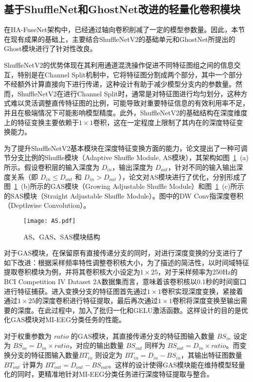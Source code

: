 \subsection{基于ShuffleNet和GhostNet改进的轻量化卷积模块}

在HA-FuseNet架构中，已经通过轴向卷积削减了一定的模型参数量。因此，本节在现有成果的基础上，主要结合ShuffleNetV2的基础单元和GhostNet所提出的Ghost模块进行了针对性改良。

ShuffleNetV2的优势体现在其利用通道混洗操作促进不同特征图组之间的信息交互，特别是在Channel Split机制中，它将特征图分割成两个部分，其中一个部分不经额外计算直接向下进行传递，这种设计有助于减少模型分支内的参数量。然而，ShuffleNetV2在进行Channel Split时，通常是对特征图进行均匀划分，这种方式难以灵活调整直传特征图的比例，可能导致对重要特征信息的有效利用率不足，并且在极端情况下可能影响模型精度。此外，ShuffleNetV2的基础结构在深度维度上的特征变换主要依赖于\(1\times1\)卷积，这在一定程度上限制了其内在的深度特征变换能力。

为了提升ShuffleNetV2基本模块在深度特征变换方面的能力，论文提出了一种可调节分支比例的Shuffle模块（Adaptive Shuffle Module, AS模块），其架构如图~\ref{fig:as}~(a)所示。假设卷积层的输入深度为 \(D_{in}\)，输出深度为 \(D_{out}\)，针对不同的输入输出深度关系（即 \(D_{in} \le D_{out}\) 和 \(D_{in} > D_{out}\) ），论文对AS模块进行了优化，分别形成了图~\ref{fig:as}~(b)所示的GAS模块（Growing Adjustable Shuffle Module）和图~\ref{fig:as}~(c)所示的SAS模块（Straight Adjustable Shuffle Module）。图中的DW Conv指深度卷积（Depthwise Convolution）。
\begin{figure}
    \centering
    \texttt{[image: AS.pdf]}
    \caption{AS、GAS、SAS模块结构}
    \label{fig:as}
\end{figure}

对于GAS模块，在保留原有直接传递分支的同时，对进行深度变换的分支进行了如下改进：根据采样频率特性调整卷积核大小，为了描述的简洁性，以时间域特征提取卷积模块为例，并将其卷积核大小设定为\(1 \times 25\)，对于采样频率为250Hz的BCI Competition IV Dataset 2A数据集而言，意味着该卷积核以0.1秒的时间窗口进行特征捕获。进入变换分支的特征图首先通过\(1 \times 1\)卷积实现深度变换，紧接着通过\(1 \times 25\)的深度卷积进行特征提取，最后再次通过\(1 \times 1\)卷积将深度变换至输出需要的深度。在此过程中，加入了批归一化和GELU激活函数。这样设计的目的是优化GAS模块对MI-EEG分类任务的性能。

对于权重参数为 \(ratio\) 的GAS模块，其直接传递分支的特征图输入数量 \(BS_{in}\) 设定为 \(BS_{in} = D_{in} \times ratio\)，对应的输出数量 \(BS_{out}\) 同样为 \(BS_{out} = D_{in} \times ratio\)。而变换分支的特征图输入数量\(BT_{in}\) 则设定为 \(BT_{in} = D_{in} - BS_{in}\)，其输出特征图数量 \(BT_{out}\) 计算为 \(BT_{out} = D_{out} - BS_{out}\)。这样的设计使得GAS模块能在维持模型轻量化的同时，更精准地针对MI-EEG分类任务进行深度特征提取与整合。

